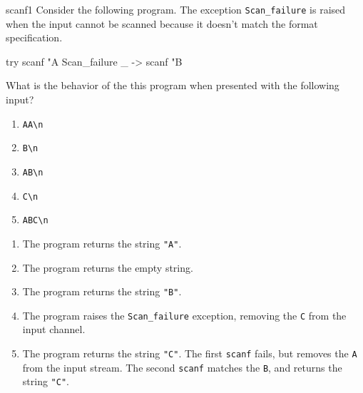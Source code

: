 %
\begin{exercise}{scanf1}
Consider the following program.  The
exception \hbox{\lstinline+Scan_failure+} is raised when the input
cannot be scanned because it doesn't match the format specification.

\begin{ocaml}
try scanf "A%
   Scan_failure _ ->
      scanf "B%
\end{ocaml}
%
What is the behavior of the this program when presented with the
following input?
\begin{enumerate}
\item \lstinline+AA\n+
\item \lstinline+B\n+
\item \lstinline+AB\n+
\item \lstinline+C\n+
\item \lstinline+ABC\n+
\end{enumerate}

\begin{answer}\ifanswers
\begin{enumerate}
\item The program returns the string \hbox{\lstinline+"A"+}.
\item The program returns the empty string.
\item The program returns the string \hbox{\lstinline+"B"+}.
\item The program raises the \hbox{\lstinline+Scan_failure+} exception, removing
the \hbox{\lstinline+C+} from the input channel.
\item

The program returns the string \hbox{\lstinline+"C"+}.  The
first \hbox{\lstinline+scanf+} fails, but removes
the \hbox{\lstinline+A+} from the input stream.  The
second \hbox{\lstinline+scanf+} matches the \hbox{\lstinline+B+}, and
returns the string \hbox{\lstinline+"C"+}.
\end{enumerate}
\fi\end{answer}
\end{exercise}

